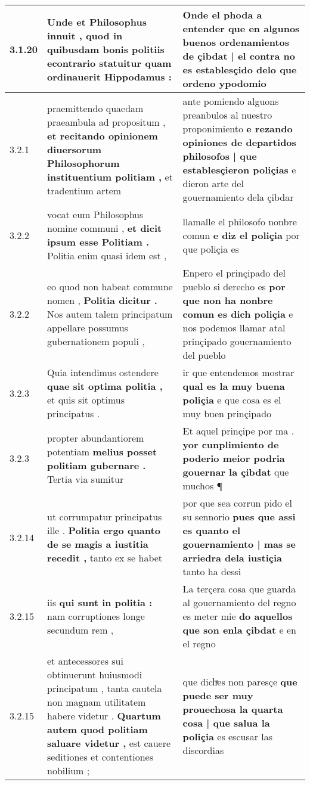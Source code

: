 \begin{tabular}{|p{1cm}|p{6.5cm}|p{6.5cm}|}
3.1.20 & Unde et Philosophus innuit , \textbf{ quod in quibusdam bonis politiis econtrario statuitur } quam ordinauerit Hippodamus : & Onde el phoda a entender \textbf{ que en algunos buenos ordenamientos de çibdat | el contra no es establesçido } delo que ordeno ypodomio \\\hline
3.2.1 & praemittendo quaedam praeambula ad propositum , \textbf{ et recitando opinionem diuersorum Philosophorum instituentium politiam , } et tradentium artem & ante pomiendo alguons preanbulos al nuestro proponimiento \textbf{ e rezando opiniones de departidos philosofos | que establesçieron poliçias } e dieron arte del gouernamiento dela çibdar \\\hline
3.2.2 & vocat eum Philosophus nomine communi , \textbf{ et dicit ipsum esse Politiam . } Politia enim quasi idem est , & llamalle el philosofo nonbre comun \textbf{ e diz el poliçia } por que poliçia es \\\hline
3.2.2 & eo quod non habeat commune nomen , \textbf{ Politia dicitur . } Nos autem talem principatum appellare possumus gubernationem populi , & Enpero el prinçipado del pueblo si derecho es \textbf{ por que non ha nonbre comun es dich poliçia } e nos podemos llamar atal prinçipado gouernamiento del pueblo \\\hline
3.2.3 & Quia intendimus ostendere \textbf{ quae sit optima politia , } et quis sit optimus principatus . & ir que entendemos mostrar \textbf{ qual es la muy buena poliçia } e que cosa es el muy buen prinçipado \\\hline
3.2.3 & propter abundantiorem potentiam \textbf{ melius posset politiam gubernare . } Tertia via sumitur & Et aquel prinçipe por ma . \textbf{ yor cunplimiento de poderio meior podria gouernar la çibdat } que muchos ¶ \\\hline
3.2.14 & ut corrumpatur principatus ille . \textbf{ Politia ergo quanto de se magis a iustitia recedit , } tanto ex se habet & por que sea corrun pido el su sennorio \textbf{ pues que assi es quanto el gouernamiento | mas se arriedra dela iustiçia } tanto ha dessi \\\hline
3.2.15 & iis \textbf{ qui sunt in politia : } nam corruptiones longe secundum rem , & La terçera cosa que guarda al gouernamiento del regno es meter mie \textbf{ do aquellos que son enla çibdat } e en el regno \\\hline
3.2.15 & et antecessores sui obtinuerunt huiusmodi principatum , tanta cautela non magnam utilitatem habere videtur . \textbf{ Quartum autem quod politiam saluare videtur , } est cauere seditiones et contentiones nobilium ; & que dichͣes non paresçe \textbf{ que puede ser muy prouechosa la quarta cosa | que salua la poliçia } es escusar las discordias \\\hline

\end{tabular}
